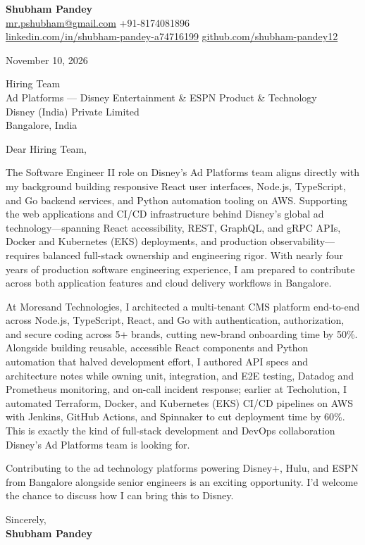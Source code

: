 \documentclass[a4paper,11pt]{article}
\begin{document}
\textbf{\Large Shubham Pandey}\\
\href{mailto:mr.pshubham@gmail.com}{mr.pshubham@gmail.com} \quad +91-8174081896\\
\href{https://www.linkedin.com/in/shubham-pandey-a74716199/}{linkedin.com/in/shubham-pandey-a74716199} \quad
\href{https://github.com/shubham-pandey12}{github.com/shubham-pandey12}

\vspace{1em}
November 10, 2026

\vspace{1em}
Hiring Team\\
Ad Platforms --- Disney Entertainment \& ESPN Product \& Technology\\
Disney (India) Private Limited\\
Bangalore, India

\vspace{1em}
Dear Hiring Team,

The Software Engineer II role on Disney's Ad Platforms team aligns directly with my background building responsive React user interfaces, Node.js, TypeScript, and Go backend services, and Python automation tooling on AWS. Supporting the web applications and CI/CD infrastructure behind Disney's global ad technology---spanning React accessibility, REST, GraphQL, and gRPC APIs, Docker and Kubernetes (EKS) deployments, and production observability---requires balanced full-stack ownership and engineering rigor. With nearly four years of production software engineering experience, I am prepared to contribute across both application features and cloud delivery workflows in Bangalore.

At Moresand Technologies, I architected a multi-tenant CMS platform end-to-end across Node.js, TypeScript, React, and Go with authentication, authorization, and secure coding across 5+ brands, cutting new-brand onboarding time by 50\%. Alongside building reusable, accessible React components and Python automation that halved development effort, I authored API specs and architecture notes while owning unit, integration, and E2E testing, Datadog and Prometheus monitoring, and on-call incident response; earlier at Techolution, I automated Terraform, Docker, and Kubernetes (EKS) CI/CD pipelines on AWS with Jenkins, GitHub Actions, and Spinnaker to cut deployment time by 60\%. This is exactly the kind of full-stack development and DevOps collaboration Disney's Ad Platforms team is looking for.

Contributing to the ad technology platforms powering Disney+, Hulu, and ESPN from Bangalore alongside senior engineers is an exciting opportunity. I'd welcome the chance to discuss how I can bring this to Disney.

\vspace{1em}
Sincerely,\\[0.5em]
\textbf{Shubham Pandey}
\end{document}
